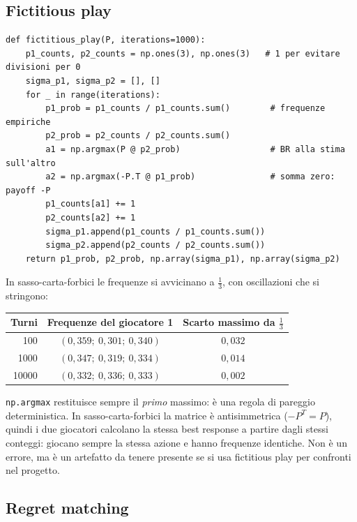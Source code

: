 \subsection{Fictitious play}

\begin{lstlisting}
def fictitious_play(P, iterations=1000):
    p1_counts, p2_counts = np.ones(3), np.ones(3)   # 1 per evitare divisioni per 0
    sigma_p1, sigma_p2 = [], []
    for _ in range(iterations):
        p1_prob = p1_counts / p1_counts.sum()        # frequenze empiriche
        p2_prob = p2_counts / p2_counts.sum()
        a1 = np.argmax(P @ p2_prob)                  # BR alla stima sull'altro
        a2 = np.argmax(-P.T @ p1_prob)               # somma zero: payoff -P
        p1_counts[a1] += 1
        p2_counts[a2] += 1
        sigma_p1.append(p1_counts / p1_counts.sum())
        sigma_p2.append(p2_counts / p2_counts.sum())
    return p1_prob, p2_prob, np.array(sigma_p1), np.array(sigma_p2)
\end{lstlisting}

In sasso-carta-forbici le frequenze si avvicinano a $\tfrac13$, con oscillazioni che si
stringono:
\begin{center}
\renewcommand{\arraystretch}{1.2}
\begin{tabular}{rcc}
\toprule
Turni & Frequenze del giocatore 1 & Scarto massimo da $\tfrac13$ \\
\midrule
100    & $(0{,}359;\ 0{,}301;\ 0{,}340)$ & $0{,}032$ \\
1000   & $(0{,}347;\ 0{,}319;\ 0{,}334)$ & $0{,}014$ \\
10000  & $(0{,}332;\ 0{,}336;\ 0{,}333)$ & $0{,}002$ \\
\bottomrule
\end{tabular}
\end{center}

\begin{osservazione}
\texttt{np.argmax} restituisce sempre il \emph{primo} massimo: è una regola di pareggio
deterministica. In sasso-carta-forbici la matrice è antisimmetrica ($-P^T = P$), quindi i due
giocatori calcolano la stessa best response a partire dagli stessi conteggi: giocano sempre
la stessa azione e hanno frequenze identiche. Non è un errore, ma è un artefatto da tenere presente se si usa fictitious play
per confronti nel progetto.
\end{osservazione}

\subsection{Regret matching}

